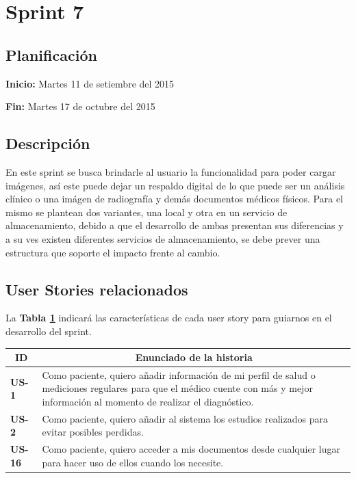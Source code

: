 \documentclass[a4paper,12pt]{article}
\begin{document}

\section{Sprint 7} %

\subsection{Planificación}

\textbf{Inicio: }Martes 11 de setiembre del 2015 

\textbf{Fin:} Martes 17 de octubre del 2015



\subsection{Descripción}

En este sprint se busca brindarle al usuario la funcionalidad para poder cargar imágenes, así este puede dejar un respaldo digital de lo que puede ser un análisis clínico o una imágen de radiografía y demás documentos médicos físicos. Para el mismo se plantean dos variantes, una local y otra en un servicio de almacenamiento, debido a que el desarrollo de ambas presentan sus diferencias y a su ves existen diferentes servicios de almacenamiento, se debe prever una estructura que soporte el impacto frente al cambio.

\subsection{User Stories relacionados}
La \textbf{Tabla \ref{US-Sprint7} } indicará las características de cada user story para guiarnos en el desarrollo del sprint.
\begin{table}[h]
    \label{US-Sprint7}
    \centering
	\begin{tabular}{|l|p{9cm}|}
	\hline
        \multicolumn{1}{|c|}{\textbf{ID}} &
        \multicolumn{1}{|c|}{\textbf{Enunciado de la historia}} \\          
    \hline
        \textbf{US-1 } & Como paciente, quiero  añadir información de mi perfil de salud o mediciones regulares para que el médico cuente con más y mejor información al momento de realizar el diagnóstico. \\
     \hline 
    \hline
        \textbf{US-2 } & Como paciente, quiero añadir al sistema los estudios realizados para evitar posibles perdidas.\\
     \hline 
     \hline
        \textbf{US-16 } & Como paciente, quiero acceder a mis documentos desde cualquier lugar para hacer uso de ellos cuando los necesite.\\
     \hline   
     
    \end{tabular}
\end{table}
\end{document}
